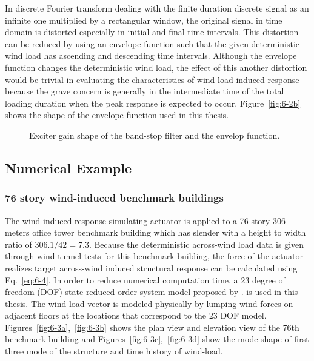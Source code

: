 In discrete Fourier transform dealing with the finite duration discrete signal as an infinite one multiplied by a rectangular window, the original signal in time domain is distorted especially in initial and final time intervals. This distortion can be reduced by using an envelope function such that the given deterministic wind load has ascending and descending time intervals. Although the envelope function changes the deterministic wind load, the effect of this another distortion would be trivial in evaluating the characteristics of wind load induced response because the grave concern is generally in the intermediate time of the total loading duration when the peak response is expected to occur. Figure~\ref{fig:6-2b} shows the shape of the envelope function used in this thesis.

\begin{figure}[!ht]
\centering
{}
\caption{Exciter gain shape of the band-stop filter and the envelop function.}
\label{fig:6-2}
\end{figure}

\subsection{Numerical Example}
\subsubsection{76 story wind-induced benchmark buildings}

The wind-induced response simulating actuator is applied to a 76-story 306 meters office tower benchmark building which has slender with a height to width ratio of $306.1/42= 7.3$. Because the deterministic across-wind load data is given through wind tunnel tests for this benchmark building, the force of the actuator realizes target across-wind induced structural response can be calculated using Eq.~\eqref{eq:6-4}. In order to reduce numerical computation time, a 23 degree of freedom (DOF) state reduced-order system model proposed by \citet{yang2004benchmark}. is used in this thesis. The wind load vector is modeled physically by lumping wind forces on adjacent floors at the locations that correspond to the 23 DOF model. Figures~\ref{fig:6-3a},~\ref{fig:6-3b} shows the plan view and elevation view of the 76th benchmark building and Figures~\ref{fig:6-3c},~\ref{fig:6-3d} show the mode shape of first three mode of the structure and time history of wind-load.

